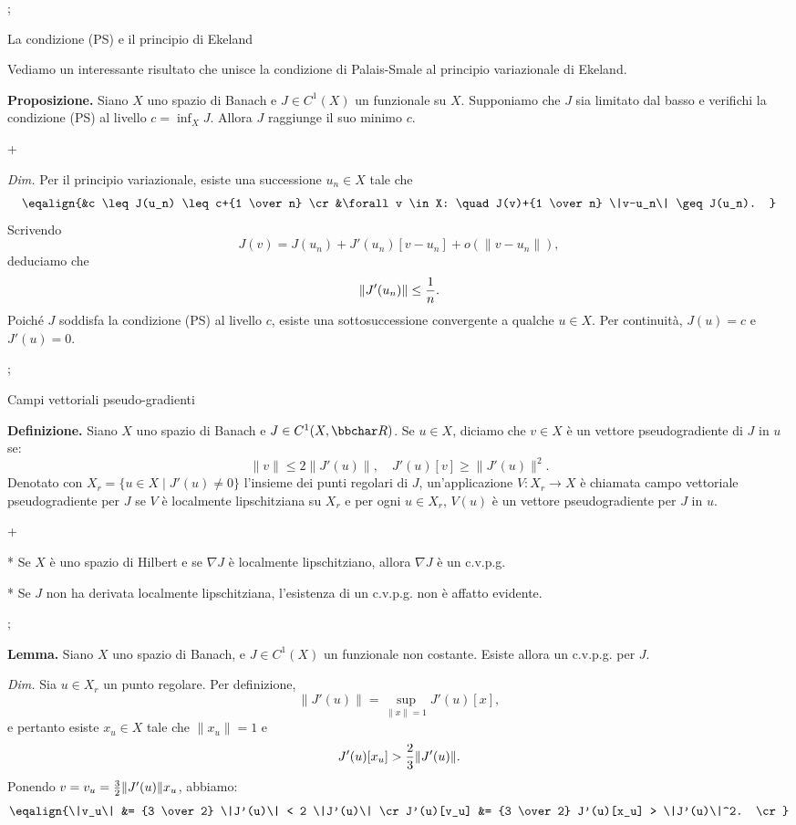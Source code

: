 \pg;

\sec La condizione (PS) e il principio di Ekeland

Vediamo un interessante risultato che unisce la condizione di Palais-Smale al principio variazionale di Ekeland.

\medskip

{\bf Proposizione.} Siano $X$ uno spazio di Banach e $J \in C^1(X)$ un
funzionale su $X$. Supponiamo che $J$ sia limitato dal basso e
verifichi la condizione (PS) al livello $c = \inf_X J$. Allora $J$
raggiunge il suo minimo $c$.

\pg+

{\em Dim.} Per il principio variazionale, esiste una successione $u_n
\in X$ tale che
$$
\eqalign{%
&c \leq J(u_n) \leq c+{1 \over n} \cr
&\forall v \in X: \quad J(v)+{1 \over n} \|v-u_n\| \geq J(u_n).
}
$$
Scrivendo
$$
J(v)=J(u_n)+J'(u_n)[v-u_n]+o(\|v-u_n\|),
$$
deduciamo che
$$
\|J'(u_n)\| \leq {1 \over n}.
$$
Poich\'e $J$ soddisfa la condizione (PS) al livello $c$, esiste una
sottosuccessione convergente a qualche $u \in X$. Per continuit\`a,
$J(u)=c$ e $J'(u)=0$.

\pg;

\sec Campi vettoriali pseudo-gradienti

{\bf Definizione.} Siano $X$ uno spazio di Banach e $J \in
C^1(X,\R)$. Se $u \in X$, diciamo che $v \in X$ \`e un vettore
pseudogradiente di $J$ in $u$ se:
$$
\|v\| \leq 2 \|J'(u)\|, \quad J'(u)[v] \geq \|J'(u)\|^2.
$$
Denotato con $X_r = \{u \in X \mid J'(u) \neq 0\}$ l'insieme dei punti
regolari di $J$, un'applicazione $V \colon X_r \to X$ \`e chiamata
campo vettoriale pseudogradiente per $J$ se $V$ \`e localmente
lipschitziana su $X_r$ e per ogni $u \in X_r$, $V(u)$ \`e un vettore
pseudogradiente per $J$ in $u$.

\pg+

* Se $X$ \`e uno spazio di Hilbert e se $\nabla J$ \`e localmente
  lipschitziano, allora $\nabla J$ \`e un c.v.p.g.

* Se $J$ non ha derivata localmente lipschitziana, l'esistenza di un
  c.v.p.g. non \`e affatto evidente.

\pg;

{\bf Lemma.} Siano $X$ uno spazio di Banach, e $J \in C^1(X)$ un
funzionale non costante. Esiste allora un c.v.p.g. per $J$.

\smallskip

{\em Dim.} Sia $u \in X_r$ un punto regolare. Per definizione,
$$
\|J'(u) \| = \sup_{\|x\|=1} J'(u)[x],
$$
e pertanto esiste $x_u \in X$ tale che $\|x_u\|=1$ e
$$
J'(u)[x_u] > {2 \over 3} \|J'(u)\|.
$$
Ponendo $v=v_u={3 \over 2} \|J'(u)\|x_u$, abbiamo:
$$
\eqalign{%
\|v_u\| &= {3 \over 2} \|J'(u)\| < 2 \|J'(u)\| \cr
J'(u)[v_u] &= {3 \over 2} J'(u)[x_u] > \|J'(u)\|^2. \cr
}
$$

